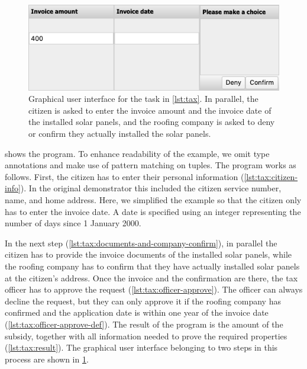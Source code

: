 \begin{figure}[b]
  \includegraphics[width=\columnwidth]{figures/tax-enter}
  \caption{
    Graphical user interface for the task in \cref{lst:tax}.
    In parallel, the citizen is asked to enter the invoice amount and the invoice date of the installed solar panels,
    and the roofing company is asked to deny or confirm they actually installed the solar panels.
  }
  \label{fig:tax}
\end{figure}

 shows the program.
To enhance readability of the example,
we omit type annotations and make use of pattern matching on tuples.
The program works as follows.
First, the citizen has to enter their personal information (\cref{lst:tax:citizen-info}).
In the original demonstrator this included the citizen service number, name, and home address.
Here, we simplified the example so that the citizen only has to enter the invoice date.
A date is specified using an integer representing the number of days since 1 January 2000.

In the next step (\cref{lst:tax:documents-and-company-confirm}), in parallel the citizen has to provide the invoice documents of the installed solar panels, while the roofing company has to confirm that they have actually installed solar panels at the citizen's address.
Once the invoice and the confirmation are there, the tax officer has to approve the request (\cref{lst:tax:officer-approve}).
The officer can always decline the request, but they can only approve it if the roofing company has confirmed and the application date is within one year of the invoice date (\cref{lst:tax:officer-approve-def}).
The result of the program is the amount of the subsidy, together with all information needed to prove the required properties (\cref{lst:tax:result}).
The graphical user interface belonging to two steps in this process are shown in \cref{fig:tax}.

